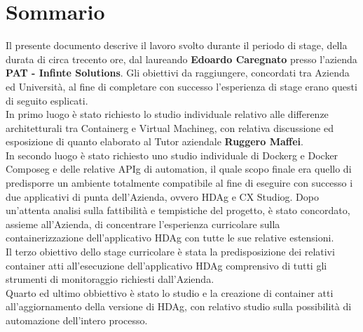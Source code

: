 
\cleardoublepage
{}
{}
\begingroup
\let\clearpage\relax
\let\cleardoublepage\relax
\let\cleardoublepage\relax

\chapter*{Sommario}

Il presente documento descrive il lavoro svolto durante il periodo di stage, della durata di circa trecento ore, dal laureando \textbf{Edoardo Caregnato} presso l'azienda \textbf{PAT - Infinte Solutions}.
Gli obiettivi da raggiungere, concordati tra Azienda ed Università, al fine di completare con successo l'esperienza di stage erano questi di seguito esplicati.\\
In primo luogo è stato richiesto lo studio individuale relativo alle differenze architetturali tra \gls{Containerg} e \gls{Virtual Machineg}, con relativa discussione ed esposizione di quanto elaborato al Tutor aziendale \textbf{Ruggero Maffei}.\\
In secondo luogo è stato richiesto uno studio individuale di \gls{Dockerg} e \gls{Docker Composeg} e delle relative \gls{APIg} di automation, il quale scopo finale era quello di predisporre un ambiente totalmente compatibile al fine di eseguire con successo i due applicativi di punta dell'Azienda, ovvero \gls{HDAg} e \gls{CX Studiog}. Dopo un'attenta analisi sulla fattibilità e tempistiche del progetto, è stato concordato, assieme all'Azienda, di concentrare l'esperienza curricolare sulla containerizzazione dell'applicativo \gls{HDAg} con tutte le sue relative estensioni.\\
Il terzo obiettivo dello stage curricolare è stata la predisposizione dei relativi container atti all'esecuzione dell'applicativo \gls{HDAg} comprensivo di tutti gli strumenti di monitoraggio richiesti dall'Azienda.\\
Quarto ed ultimo obbiettivo è stato lo studio e la creazione di container atti all'aggiornamento della versione di \gls{HDAg}, con relativo studio sulla possibilità di automazione dell'intero processo.

%
%

\endgroup			

\vfill


